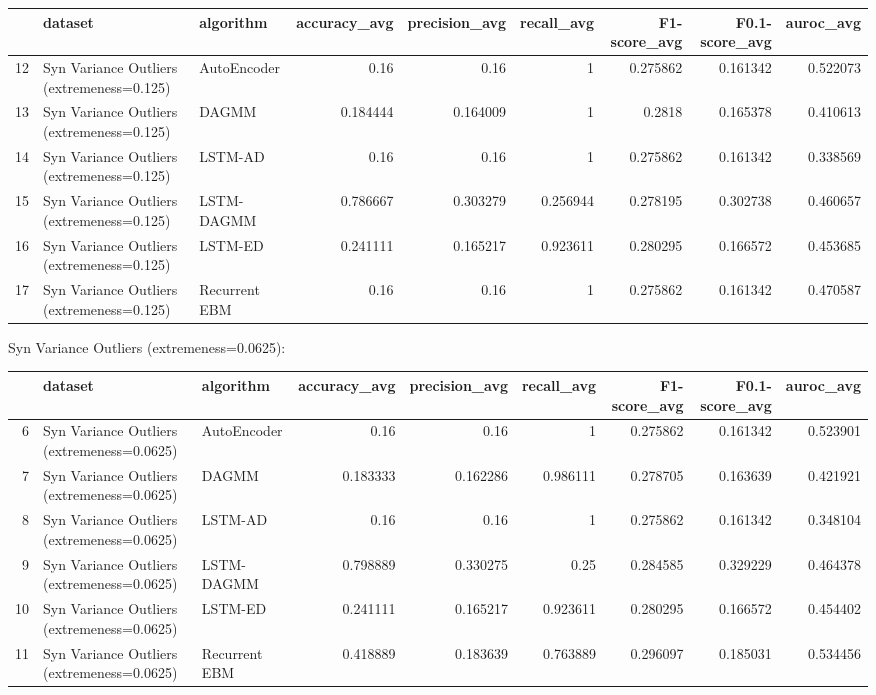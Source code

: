 \begin{tabular}{rllrrrrrr}
\hline
    & dataset                                   & algorithm     &   accuracy\_avg &   precision\_avg &   recall\_avg &   F1-score\_avg &   F0.1-score\_avg &   auroc\_avg \\
\hline
 12 & Syn Variance Outliers (extremeness=0.125) & AutoEncoder   &       0.16     &        0.16     &     1        &       0.275862 &         0.161342 &    0.522073 \\
 13 & Syn Variance Outliers (extremeness=0.125) & DAGMM         &       0.184444 &        0.164009 &     1        &       0.2818   &         0.165378 &    0.410613 \\
 14 & Syn Variance Outliers (extremeness=0.125) & LSTM-AD       &       0.16     &        0.16     &     1        &       0.275862 &         0.161342 &    0.338569 \\
 15 & Syn Variance Outliers (extremeness=0.125) & LSTM-DAGMM    &       0.786667 &        0.303279 &     0.256944 &       0.278195 &         0.302738 &    0.460657 \\
 16 & Syn Variance Outliers (extremeness=0.125) & LSTM-ED       &       0.241111 &        0.165217 &     0.923611 &       0.280295 &         0.166572 &    0.453685 \\
 17 & Syn Variance Outliers (extremeness=0.125) & Recurrent EBM &       0.16     &        0.16     &     1        &       0.275862 &         0.161342 &    0.470587 \\
\hline
\end{tabular}

Syn Variance Outliers (extremeness=0.0625):

\begin{tabular}{rllrrrrrr}
\hline
    & dataset                                    & algorithm     &   accuracy\_avg &   precision\_avg &   recall\_avg &   F1-score\_avg &   F0.1-score\_avg &   auroc\_avg \\
\hline
  6 & Syn Variance Outliers (extremeness=0.0625) & AutoEncoder   &       0.16     &        0.16     &     1        &       0.275862 &         0.161342 &    0.523901 \\
  7 & Syn Variance Outliers (extremeness=0.0625) & DAGMM         &       0.183333 &        0.162286 &     0.986111 &       0.278705 &         0.163639 &    0.421921 \\
  8 & Syn Variance Outliers (extremeness=0.0625) & LSTM-AD       &       0.16     &        0.16     &     1        &       0.275862 &         0.161342 &    0.348104 \\
  9 & Syn Variance Outliers (extremeness=0.0625) & LSTM-DAGMM    &       0.798889 &        0.330275 &     0.25     &       0.284585 &         0.329229 &    0.464378 \\
 10 & Syn Variance Outliers (extremeness=0.0625) & LSTM-ED       &       0.241111 &        0.165217 &     0.923611 &       0.280295 &         0.166572 &    0.454402 \\
 11 & Syn Variance Outliers (extremeness=0.0625) & Recurrent EBM &       0.418889 &        0.183639 &     0.763889 &       0.296097 &         0.185031 &    0.534456 \\
\hline
\end{tabular}

